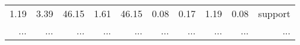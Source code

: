 \begin{table*}[]
\begin{tabular}{@{}rrrrrrrrrc@{}}
      1.19                                                                            & 3.39                                                                                   & 46.15                                                                          & 1.61                                                                                     & 46.15                                                                                    & 0.08                                                                            & 0.17                                                                                     & 1.19                                                                           & 0.08                                                                             & support                                                       \\
      ...                                                                             & ...                                                                                    & ...                                                                            & ...                                                                                      & ...                                                                                      & ...                                                                             & ...                                                                                      & ...                                                                            & ...                                                                              & \multicolumn{1}{r}{...}                                       \\ \bottomrule
   \end{tabular}
\end{table*}